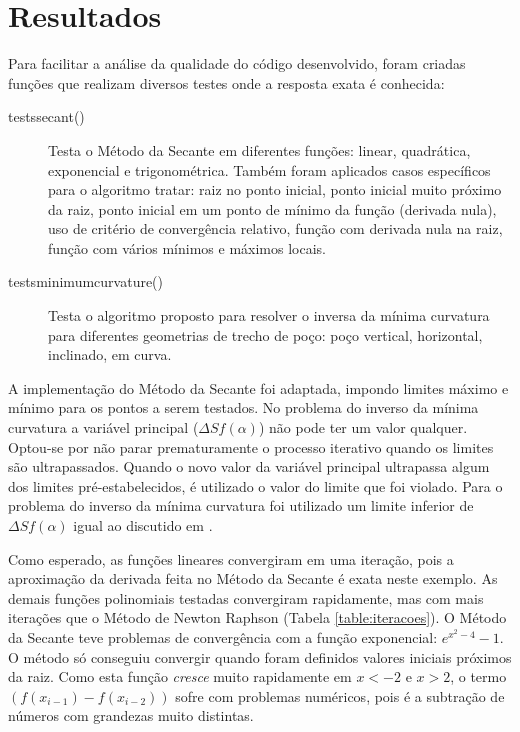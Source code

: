 \documentclass[final,5p]{elsarticle}
\numberwithin{equation}{section}
\begin{document}
    \section{Resultados}

    Para facilitar a análise da qualidade do código desenvolvido, foram criadas funções que realizam diversos testes onde a resposta exata é conhecida:

    \begin{description}
        \item[tests\textunderscore secant()] Testa o Método da Secante em diferentes funções: linear, quadrática, exponencial e trigonométrica. Também foram aplicados casos específicos para o algoritmo tratar: raiz no ponto inicial, ponto inicial muito próximo da raiz, ponto inicial em um ponto de mínimo da função (derivada nula), uso de critério de convergência relativo, função com derivada nula na raiz, função com vários mínimos e máximos locais.

        \item[tests\textunderscore minimum\textunderscore curvature()] Testa o algoritmo proposto para resolver o inversa da mínima curvatura para diferentes geometrias de trecho de poço: poço vertical, horizontal, inclinado, em curva.
    \end{description}

    A implementação do Método da Secante foi adaptada, impondo limites máximo e mínimo para os pontos a serem testados. No problema do inverso da mínima curvatura a variável principal ($\Delta S f(\alpha)$) não pode ter um valor qualquer. Optou-se por não parar prematuramente o processo iterativo quando os limites são ultrapassados. Quando o novo valor da variável principal ultrapassa algum dos limites pré-estabelecidos, é utilizado o valor do limite que foi violado. Para o problema do inverso da mínima curvatura foi utilizado um limite inferior de $\Delta S f(\alpha)$ igual ao discutido em \cite{relatoriobisseccao}.

    Como esperado, as funções lineares convergiram em uma iteração, pois a aproximação da derivada feita no Método da Secante é exata neste exemplo. As demais funções polinomiais testadas convergiram rapidamente, mas com mais iterações que o Método de Newton Raphson (Tabela \ref{table:iteracoes}). O Método da Secante teve problemas de convergência com a função exponencial: $e^{x^2-4}-1$. O método só conseguiu convergir quando foram definidos valores iniciais próximos da raiz. Como esta função \emph{cresce} muito rapidamente em $x<-2$ e $x>2$, o termo $(f(x_{i-1})-f(x_{i-2}))$ sofre com problemas numéricos, pois é a subtração de números com grandezas muito distintas.
\end{document}
